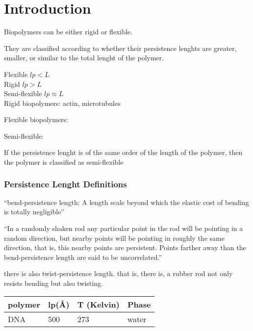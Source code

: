 \part{Introduction}
Biopolymers can be either rigid or flexible. 

They are classified according to whether their persistence lenghts are
greater, smaller, or similar to the total lenght of the polymer.

Flexible          $lp < L$\\
Rigid             $lp > L$\\
Semi-flexible     $lp \approx L$\\

Rigid biopolymers:
actin, microtubules

Flexible biopolymers:


Semi-flexible:

If the persistence lenght is of the same order of the length of the
polymer, then the polymer is classified as  semi-flexible

\section{Persistence Lenght Definitions}

``bend-persistence length: 
A length scale beyond which the elastic cost of bending is totally
negligible''

``In a randomly shaken rod any particular point in the rod will be
pointing in a random direction, but nearby points will be pointing in
roughly the same direction, that is, this nearby points are
persistent. Points farther away than the bend-persistence length are
said to be uncorrelated.''


there is also twist-persistence length.
that is, there is, a rubber rod not only resists bending but also twisting.



\begin{tabular}{|l|l|l|l|}
\hline 
polymer & lp(\AA) & T (Kelvin) & Phase \\ \hline
DNA     & 500     &  273       & water \\ \hline
\end{tabular}
